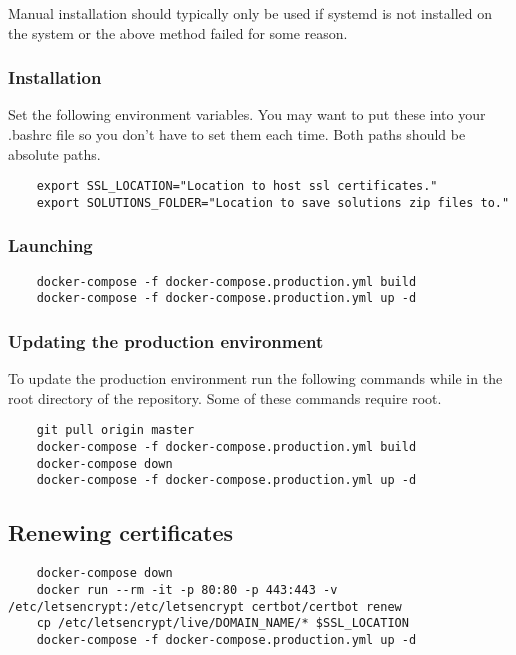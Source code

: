 Manual installation should typically only be used if systemd is not installed on the system or the above method failed for some reason.

\subsubsection{Installation}

Set the following environment variables.  You may want to put these into your .bashrc file so you don't have to set them each time.  Both paths should be absolute paths.

\begin{verbatim}
	export SSL_LOCATION="Location to host ssl certificates."
	export SOLUTIONS_FOLDER="Location to save solutions zip files to."
\end{verbatim}

\subsubsection{Launching}

\begin{verbatim}
	docker-compose -f docker-compose.production.yml build
	docker-compose -f docker-compose.production.yml up -d
\end{verbatim}

\subsubsection{Updating the production environment}

To update the production environment run the following commands while in the root directory of the repository.  Some of these commands require root.

\begin{verbatim}
	git pull origin master
	docker-compose -f docker-compose.production.yml build
	docker-compose down
	docker-compose -f docker-compose.production.yml up -d
\end{verbatim}

\subsection{Renewing certificates} \label{section:certificate-renewal}

\begin{verbatim}
	docker-compose down
	docker run --rm -it -p 80:80 -p 443:443 -v /etc/letsencrypt:/etc/letsencrypt certbot/certbot renew
	cp /etc/letsencrypt/live/DOMAIN_NAME/* $SSL_LOCATION
	docker-compose -f docker-compose.production.yml up -d
\end{verbatim}
